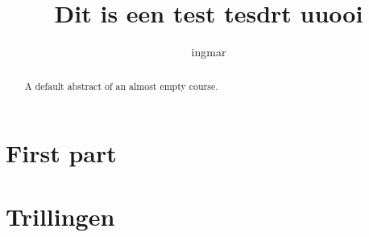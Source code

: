\documentclass{xourse}
\title{Dit is een test tesdrt uuooi}
\author{ingmar}
\begin{document}
\begin{abstract}
    A default abstract of an almost empty course.
\end{abstract}
\maketitle

\part{First part}


\part{Trillingen}
\end{document}

